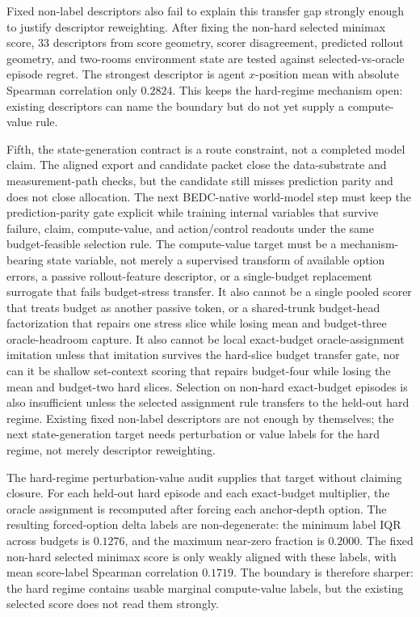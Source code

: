 Fixed non-label descriptors also fail to explain this transfer gap strongly
enough to justify descriptor reweighting.  After fixing the non-hard selected
minimax score, $33$ descriptors from score geometry, scorer disagreement,
predicted rollout geometry, and two-rooms environment state are tested against
selected-vs-oracle episode regret.  The strongest descriptor is agent
$x$-position mean with absolute Spearman correlation only $0.2824$.  This
keeps the hard-regime mechanism open: existing descriptors can name the
boundary but do not yet supply a compute-value rule.

Fifth, the state-generation contract is a route constraint, not a completed
model claim.  The aligned export and candidate packet close the data-substrate
and measurement-path checks, but the candidate still misses prediction parity
and does not close allocation.  The next BEDC-native world-model step must keep
the prediction-parity gate explicit while training internal variables that
survive failure, claim, compute-value, and action/control readouts under the
same budget-feasible selection rule.  The compute-value target must be a
mechanism-bearing state variable, not merely a supervised transform of
available option errors, a passive rollout-feature descriptor, or a
single-budget replacement surrogate that fails budget-stress transfer.  It also
cannot be a single pooled scorer that treats budget as another passive token, or
a shared-trunk budget-head factorization that repairs one stress slice while
losing mean and budget-three oracle-headroom capture.  It also cannot be local
exact-budget oracle-assignment imitation unless that imitation survives the
hard-slice budget transfer gate, nor can it be shallow set-context scoring that
repairs budget-four while losing the mean and budget-two hard slices.
Selection on non-hard exact-budget episodes is also insufficient unless the
selected assignment rule transfers to the held-out hard regime.
Existing fixed non-label descriptors are not enough by themselves; the next
state-generation target needs perturbation or value labels for the hard regime,
not merely descriptor reweighting.

The hard-regime perturbation-value audit supplies that target without claiming
closure.  For each held-out hard episode and each exact-budget multiplier, the
oracle assignment is recomputed after forcing each anchor-depth option.  The
resulting forced-option delta labels are non-degenerate: the minimum label IQR
across budgets is $0.1276$, and the maximum near-zero fraction is $0.2000$.
The fixed non-hard selected minimax score is only weakly aligned with these
labels, with mean score-label Spearman correlation $0.1719$.  The boundary is
therefore sharper: the hard regime contains usable marginal compute-value
labels, but the existing selected score does not read them strongly.

